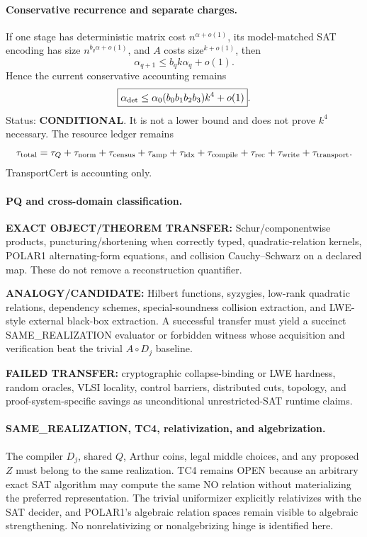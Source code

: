 \documentclass[11pt]{article}
\begin{document}
\paragraph{Conservative recurrence and separate charges.}
If one stage has deterministic matrix cost $n^{\alpha+o(1)}$, its model-matched SAT encoding has size $n^{b_q\alpha+o(1)}$, and $A$ costs size$^{k+o(1)}$, then
\[\alpha_{q+1}\le b_qk\alpha_q+o(1).\]
Hence the current conservative accounting remains
\[
\boxed{\alpha_{\rm det}\le\alpha_0(b_0b_1b_2b_3)k^4+o(1)}.
\]
Status: \textbf{CONDITIONAL}. It is not a lower bound and does not prove $k^4$ necessary. The resource ledger remains
\[
\tau_{\rm total}=\tau_Q+\tau_{\rm norm}+\tau_{\rm census}+\tau_{\rm amp}+\tau_{\rm idx}+\tau_{\rm compile}+\tau_{\rm rec}+\tau_{\rm write}+\tau_{\rm transport}.
\]
TransportCert is accounting only.

\paragraph{PQ and cross-domain classification.}
\textbf{EXACT OBJECT/THEOREM TRANSFER:} Schur/componentwise products, puncturing/shortening when correctly typed, quadratic-relation kernels, POLAR1 alternating-form equations, and collision Cauchy--Schwarz on a declared map. These do not remove a reconstruction quantifier.

\textbf{ANALOGY/CANDIDATE:} Hilbert functions, syzygies, low-rank quadratic relations, dependency schemes, special-soundness collision extraction, and LWE-style external black-box extraction. A successful transfer must yield a succinct SAME\_REALIZATION evaluator or forbidden witness whose acquisition and verification beat the trivial $A\circ D_j$ baseline.

\textbf{FAILED TRANSFER:} cryptographic collapse-binding or LWE hardness, random oracles, VLSI locality, control barriers, distributed cuts, topology, and proof-system-specific savings as unconditional unrestricted-SAT runtime claims.

\paragraph{SAME\_REALIZATION, TC4, relativization, and algebrization.}
The compiler $D_j$, shared $Q$, Arthur coins, legal middle choices, and any proposed $Z$ must belong to the same realization. TC4 remains OPEN because an arbitrary exact SAT algorithm may compute the same NO relation without materializing the preferred representation. The trivial uniformizer explicitly relativizes with the SAT decider, and POLAR1's algebraic relation spaces remain visible to algebraic strengthening. No nonrelativizing or nonalgebrizing hinge is identified here.
\end{document}

